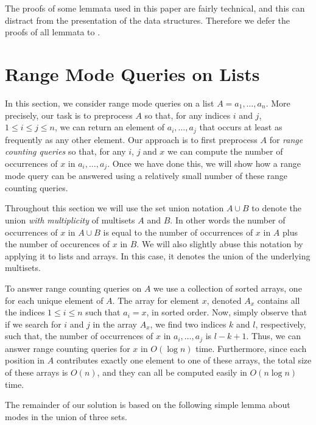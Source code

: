 \documentclass{njcarticle}
\begin{document}
The proofs of some lemmata used in this paper are fairly technical,
and this can distract from the presentation of the data structures.
Therefore we defer the proofs of all lemmata to .

\section{Range Mode Queries on Lists}

In this section, we consider range mode queries on a list
$A=a_1,\ldots,a_n$.  More precisely, our task is to preprocess $A$ so
that, for any indices $i$ and $j$, $1\le i\le j\le n$, we can return
an element of $a_i,\ldots,a_j$ that occurs at least as frequently as
any other element.  Our approach is to first preprocess $A$ for
\emph{range counting queries} so that, for any $i$, $j$ and $x$ we can
compute the number of occurrences of $x$ in $a_i,\ldots,a_j$.  Once we
have done this, we will show how a range mode query can be answered
using a relatively small number of these range counting queries.

Throughout this section we will use the set union notation $A\cup B$
to denote the union \emph{with multiplicity} of multisets $A$ and $B$.
In other words the number of occurrences of $x$ in $A\cup B$ is equal
to the number of occurrences of $x$ in $A$ plus the number of
occurences of $x$ in $B$.  We will also slightly abuse this notation
by applying it to lists and arrays.  In this case, it denotes the
union of the underlying multisets.

To answer range counting queries on $A$ we use a collection of sorted
arrays, one for each unique element of $A$.  The array for element
$x$, denoted $A_x$ contains all the indices $1\le i\le n$ such that
$a_i=x$, in sorted order.  Now, simply observe that if we search for
$i$ and $j$ in the array $A_x$, we find two indices $k$ and $l$,
respectively, such that, the number of occurrences of $x$ in
$a_i,\ldots,a_j$ is $l-k+1$.  Thus, we can answer range counting queries
for $x$ in $O(\log n)$ time.  Furthermore, since each position in $A$
contributes exactly one element to one of these arrays, the total size
of these arrays is $O(n)$, and they can all be computed easily in
$O(n\log n)$ time.

The remainder of our solution is based on the following simple lemma
about modes in the union of three sets.
\end{document}
